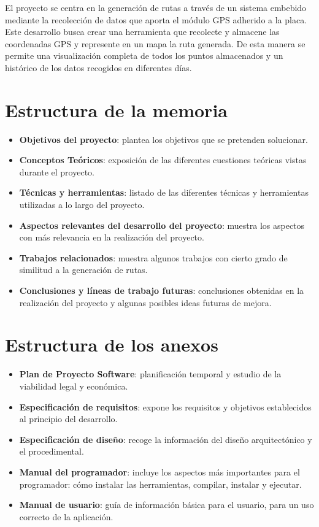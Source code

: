 

El proyecto se centra en la generación de rutas a través de un sistema embebido mediante la recolección de datos que aporta el módulo GPS adherido a la placa. Este desarrollo busca crear una herramienta que recolecte y almacene las coordenadas GPS y represente en un mapa la ruta generada. De esta manera se permite una visualización completa de todos los puntos almacenados y un histórico de los datos recogidos en diferentes días.


\section{Estructura de la memoria}

\begin{itemize}
\tightlist
\item
    \textbf{Objetivos del proyecto}: plantea los objetivos que se pretenden solucionar.
\item
    \textbf{Conceptos Teóricos}: exposición de las diferentes cuestiones teóricas vistas durante el proyecto.
\item
    \textbf{Técnicas y herramientas}: listado de las diferentes técnicas y herramientas utilizadas a lo largo del proyecto.
\item
    \textbf{Aspectos relevantes del desarrollo del proyecto}: muestra los aspectos con más relevancia en la realización del proyecto.
\item
    \textbf{Trabajos relacionados}: muestra algunos trabajos con cierto grado de similitud a la generación de rutas.
\item
    \textbf{Conclusiones y líneas de trabajo futuras}: conclusiones obtenidas en la realización del proyecto y algunas posibles ideas futuras de mejora.
\end{itemize}

\section{Estructura de los anexos}

\begin{itemize}
\tightlist
\item
    \textbf{Plan de Proyecto Software}: planificación temporal y estudio de la viabilidad legal y económica.
\item
    \textbf{Especificación de requisitos}: expone los requisitos y objetivos establecidos al principio del desarrollo.
\item
    \textbf{Especificación de diseño}: recoge la información del diseño arquitectónico y el procedimental.
\item
    \textbf{Manual del programador}: incluye los aspectos más importantes para el programador: cómo instalar las herramientas, compilar, instalar y ejecutar.
\item
    \textbf{Manual de usuario}: guía de información básica para el usuario, para un uso correcto de la aplicación.
\end{itemize}
